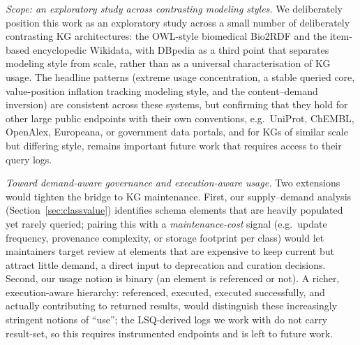 \documentclass[sw]{iosart2x}
\begin{document}
\emph{Scope: an exploratory study across contrasting modeling styles.} We deliberately position this work as an exploratory study across a small number of deliberately contrasting KG architectures: the OWL-style biomedical Bio2RDF and the item-based encyclopedic Wikidata, with DBpedia as a third point that separates modeling style from scale, rather than as a universal characterisation of KG usage. The headline patterns (extreme usage concentration, a stable queried core, value-position inflation tracking modeling style, and the content--demand inversion) are consistent across these systems, but confirming that they hold for other large public endpoints with their own conventions, e.g.\ UniProt, ChEMBL, OpenAlex, Europeana, or government data portals, and for KGs of similar scale but differing style, remains important future work that requires access to their query logs.

\emph{Toward demand-aware governance and execution-aware usage.} Two extensions would tighten the bridge to KG maintenance. First, our supply--demand analysis (Section~\ref{sec:classvalue}) identifies schema elements that are heavily populated yet rarely queried; pairing this with a \emph{maintenance-cost} signal (e.g.\ update frequency, provenance complexity, or storage footprint per class) would let maintainers target review at elements that are expensive to keep current but attract little demand, a direct input to deprecation and curation decisions. Second, our usage notion is binary (an element is referenced or not). A richer, execution-aware hierarchy: referenced, executed, executed successfully, and actually contributing to returned results, would distinguish these increasingly stringent notions of ``use''; the LSQ-derived logs we work with do not carry result-set, so this requires instrumented endpoints and is left to future work.
\end{document}

